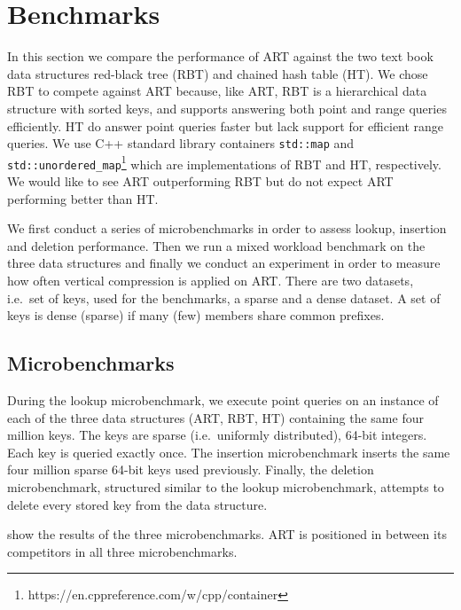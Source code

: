 \documentclass[abstracton,12pt]{scrartcl}
\theoremstyle{definition}
\begin{document}
\newpage

\section{Benchmarks}\label{sec:benchmarks}

In this section we compare the performance of ART against the two text book
data structures red-black tree (RBT) and chained hash table (HT).
We chose RBT to compete against ART because, like ART, RBT is a hierarchical
data structure with sorted keys, and supports answering both point and range
queries efficiently. HT do answer point queries faster but lack support for
efficient range queries. We use C++ standard library containers 
\texttt{std::map} and \texttt{std::unordered\_map}\footnote{https://en.cppreference.com/w/cpp/container}
which are implementations of RBT and HT, respectively.
We would like to see ART outperforming RBT but do not expect ART performing
better than HT. 

We first conduct a series of microbenchmarks in order to assess lookup,
insertion and deletion performance. Then we run a mixed workload benchmark
on the three data structures and finally we conduct an experiment in order
to measure how often vertical compression is applied on ART. There are two 
datasets, i.e.\ set of keys, used for the benchmarks, a sparse
and a dense dataset. A set of keys is dense (sparse) if many (few) members
share common prefixes.

\vspace{-3mm}
\subsection{Microbenchmarks}\label{sec:microbenchmarks}

During the lookup microbenchmark, we execute point queries on an instance
of each of the three data structures (ART, RBT, HT)
containing the same four million keys. The keys are sparse (i.e.\ uniformly
distributed), 64-bit integers. Each key is queried exactly once.
The insertion microbenchmark inserts the same four million sparse 64-bit keys
used previously. Finally, the deletion microbenchmark, structured similar to 
the lookup microbenchmark, attempts to delete every stored key from the data 
structure.

show the results of the three microbenchmarks. ART is positioned in between 
its competitors in all three microbenchmarks.
\end{document}
